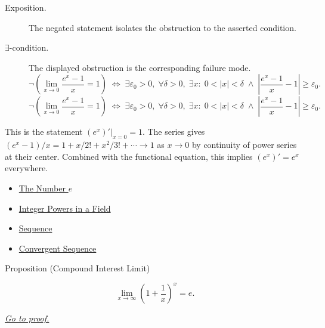 \begin{remark*}
\begin{description}
  \item[Exposition.]
  The negated statement isolates the obstruction to the asserted condition.

  \item[\(\exists\)-condition.]
  The displayed obstruction is the corresponding failure mode.
  \[
\neg\left(\lim_{x\to 0}\frac{e^x-1}{x}=1\right)
  \;\iff\;
  \exists\varepsilon_0>0,\;\forall\delta>0,\;\exists x:\;
  0<|x|<\delta \;\wedge\; \left|\frac{e^x-1}{x}-1\right|\geq\varepsilon_0.
  \]
  \[
\neg\left(\lim_{x\to 0}\frac{e^x-1}{x}=1\right)
  \;\iff\;
  \exists\varepsilon_0>0,\;\forall\delta>0,\;\exists x:\;
  0<|x|<\delta \;\wedge\; \left|\frac{e^x-1}{x}-1\right|\geq\varepsilon_0.
  \]
\end{description}
\end{remark*}



\begin{remark*}[Interpretation]
This is the statement $(e^x)'\big|_{x=0} = 1$. The series gives
$(e^x - 1)/x = 1 + x/2! + x^2/3! + \cdots \to 1$ as $x \to 0$
by continuity of power series at their center. Combined with the
functional equation, this implies $(e^x)' = e^x$ everywhere.
\end{remark*}

\begin{dependencies}
\begin{itemize}
  \item \hyperref[def:number-e]{The Number $e$}
  \item \hyperref[def:two-sided-inverse]{Integer Powers in a Field}
  \item \hyperref[def:sequence]{Sequence}
  \item \hyperref[def:convergent-sequence]{Convergent Sequence}
\end{itemize}
\end{dependencies}


\begin{propositionbox}{Proposition (Compound Interest Limit)}
\begin{proposition}
\label{prop:limit-compound-interest}
\[
  \lim_{x \to \infty} \left(1 + \frac{1}{x}\right)^x = e.
\]

\smallskip\noindent


\hyperref[prf:limit-compound-interest]{\textit{Go to proof.}}
\end{proposition}
\end{propositionbox}

